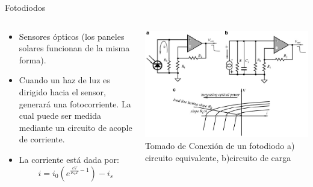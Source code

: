 \documentclass[aspectratio=169]{beamer}
\begin{document}
\begin{frame}{Fotodiodos}
    \begin{columns}[onlytextwidth]
        \begin{column}{0.55\textwidth}
            \begin{itemize}
                \item Sensores ópticos (los paneles solares funcionan de la misma forma).
                \item Cuando un haz de luz es dirigido hacia el sensor, generará una fotocorriente. La cual puede ser medida mediante un circuito de acople de corriente. 
                \item La corriente está dada por: 
                \begin{equation*}
                    i=i_{0}(e^{\frac{eV}{K_bT}-1})-i_s
                \end{equation*}
            \end{itemize}
        \end{column}
        \begin{column}{0.45\textwidth}
            \centering
            \includegraphics[width = 1\linewidth]{fig/Optica/fotodiodos.PNG}
            \tiny{Tomado de \cite{Fraden_2016}}
            \tiny{Conexión de un fotodiodo a) circuito equivalente, b)circuito de carga}
        \end{column}
    \end{columns}
\end{frame}
\end{document}

